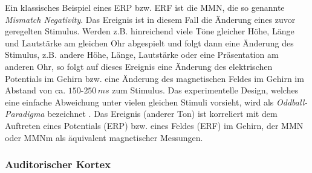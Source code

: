 \documentclass[doc,a4paper,12pt]{apa6}
\begin{document}
Ein klassisches Beispiel eines ERP bzw. ERF ist die MMN, die so genannte \emph{Mismatch Negativity}. Das Ereignis ist in diesem Fall die Änderung eines zuvor geregelten Stimulus. Werden z.B. hinreichend viele Töne gleicher Höhe, Länge und Lautstärke am gleichen Ohr abgespielt und folgt dann eine Änderung des Stimulus, z.B. andere Höhe, Länge, Lautstärke oder eine Präsentation am anderen Ohr, so folgt auf dieses Ereignis eine Änderung des elektrischen Potentials im Gehirn bzw. eine Änderung des magnetischen Feldes im Gehirn im Abstand von ca. $150$-$250\,ms$ zum Stimulus. Das experimentelle Design, welches eine einfache Abweichung unter vielen gleichen Stimuli  vorsieht, wird als \emph{Oddball-Paradigma} bezeichnet \parencite{squires1975two,naatanen1989event,paavilainen1991right}. Das Ereignis (\glqq anderer Ton\grqq) ist korreliert mit dem Auftreten eines Potentials (ERP) bzw. eines Feldes (ERF) im Gehirn, der MMN \parencite{naatanen1978early} oder MMNm als äquivalent magnetischer Messungen.

\subsubsection{Auditorischer Kortex}
\label{sec:audicort}
\end{document}
